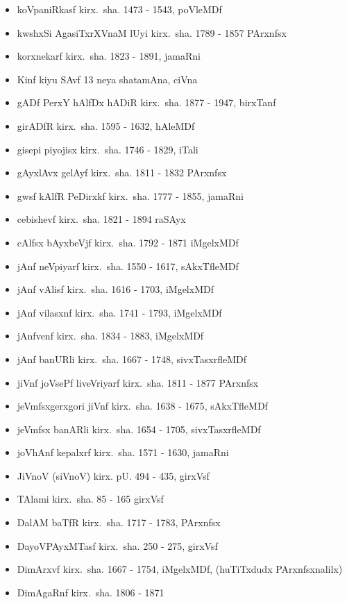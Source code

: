 {\begin{itemize}
\item koVpaniRkasf kirx.~sha. {\rm 1473 - 1543}, poVleMDf
\item kwshxSi AgasiTxrXVnaM lUyi kirx.~sha. {\rm 1789 - 1857} PArxnfsx
\item korxnekarf kirx.~sha. {\rm 1823 - 1891}, jamaRni
\item Kinf kiyu SAvf {\rm 13} neya shatamAna, ciVna
\item gADf PerxY hAlfDx hADiR kirx.~sha. {\rm 1877 - 1947}, birxTanf
\item girADfR kirx.~sha. {\rm 1595 - 1632}, hAleMDf
\item gisepi piyojisx kirx.~sha. {\rm 1746 - 1829}, iTali
\item gAyxlAvx gelAyf kirx.~sha. {\rm 1811 - 1832} PArxnfsx
\item gwsf kAlfR PeDirxkf kirx.~sha. {\rm 1777 - 1855}, jamaRni
\item cebishevf kirx.~sha. {\rm 1821 - 1894} raSAyx
\item cAlfsx bAyxbeVjf kirx.~sha. {\rm 1792 - 1871} iMgelxMDf
\item jAnf neVpiyarf kirx.~sha. {\rm 1550 - 1617}, sAkxTfleMDf
\item jAnf vAlisf kirx.~sha. {\rm 1616 - 1703}, iMgelxMDf
\item jAnf vilasxnf kirx.~sha. {\rm 1741 - 1793}, iMgelxMDf
\item jAnfvenf kirx.~sha. {\rm 1834 - 1883}, iMgelxMDf
\item jAnf banURli kirx.~sha. {\rm 1667 - 1748}, sivxTasxrfleMDf
\item jiVnf joVsePf liveVriyarf kirx.~sha. {\rm 1811 - 1877} PArxnfsx
\item jeVmfsxgerxgori jiVnf kirx.~sha. {\rm 1638 - 1675}, sAkxTfleMDf
\item jeVmfsx banARli kirx.~sha. {\rm 1654 - 1705}, sivxTasxrfleMDf
\item joVhAnf kepalxrf kirx.~sha. {\rm 1571 - 1630}, jamaRni
\item JiVnoV (siVnoV) kirx. pU. {\rm 494 - 435}, girxVsf
\item TAlami kirx.~sha. {\rm 85 - 165} girxVsf
\item DalAM baTfR kirx.~sha. {\rm 1717 - 1783}, PArxnfsx
\item DayoVPAyxMTasf kirx.~sha. {\rm 250 - 275}, girxVsf
\item DimArxvf kirx.~sha. {\rm 1667 - 1754}, iMgelxMDf, (huTiTxdudx PArxnfsxnalilx)
\item DimAgaRnf kirx.~sha. {\rm 1806 - 1871}

\end{itemize}}
